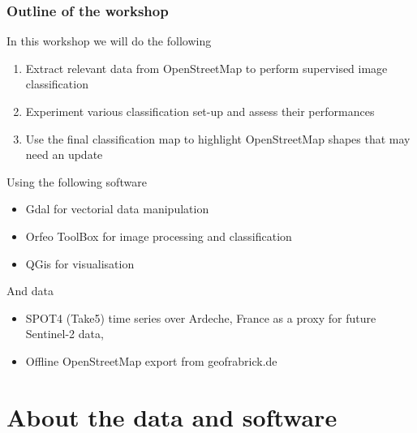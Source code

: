 \documentclass[8pt]{beamer}
\begin{document}
\begin{frame}
\frametitle{Outline of the workshop}
\begin{block}{In this workshop we will do the following}
\begin{enumerate}
\item Extract relevant data from OpenStreetMap to perform supervised image classification
\item Experiment various classification set-up and assess their performances
\item Use the final classification map to highlight OpenStreetMap shapes that may need an update
\end{enumerate}
\end{block}
\begin{block}{Using the following software}
\begin{itemize}
\item Gdal for vectorial data manipulation
\item Orfeo ToolBox for image processing and classification
\item QGis for visualisation
\end{itemize}
\end{block}
\begin{block}{And data}
\begin{itemize}
\item SPOT4 (Take5) time series over Ardeche, France as a proxy for future Sentinel-2 data,
\item Offline OpenStreetMap export from geofrabrick.de
\end{itemize}
\end{block}

\end{frame}
\section{About the data and software}
\end{document}
